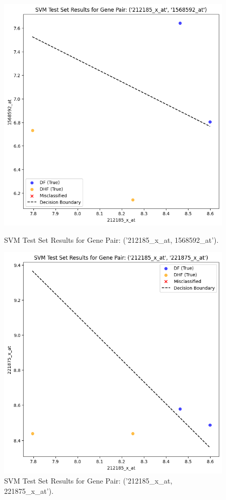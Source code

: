 \documentclass[final]{article}
\begin{document}
        \begin{figure}[H]
            \centering
            \begin{minipage}{0.45\textwidth}
                \includegraphics[width=\textwidth]{SVM (212185_x_at, 1568592_at).png}
                \caption{SVM Test Set Results for Gene Pair: ('212185\_x\_at, 1568592\_at').}
            \end{minipage}
            \hfill
            \begin{minipage}{0.45\textwidth}
                \includegraphics[width=\textwidth]{SVM (212185_x_at, 221875_x_at)}
                \caption{SVM Test Set Results for Gene Pair: ('212185\_x\_at, 221875\_x\_at').}
            \end{minipage}
        \end{figure}
\end{document}
